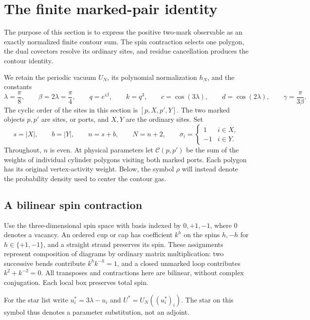 \section{The finite marked-pair identity}
\label{sec:06-magnetic-algebra}

The purpose of this section is to express the positive two-mark
observable as an exactly normalized finite contour sum. The spin
contraction selects one polygon, the dual covectors resolve its
ordinary sites, and residue cancellation produces the contour identity.

We retain the periodic vacuum \(U_N\), its polynomial normalization \(h_N\),
and the constants
\[
 \lambda=\frac{\pi}{8},\qquad \beta=2\lambda=\frac{\pi}{4},\qquad
 q=e^{i\beta},\qquad k=q^3,\qquad
 c=\cos(3\lambda),\qquad d=\cos(2\lambda),\qquad
 \gamma=\frac{\pi}{3\beta}.
\]
The cyclic order of the sites in this section is
\([p,X,p',Y]\).  The two marked objects \(p,p'\) are sites, or ports,
and \(X,Y\) are the ordinary sites.  Set
\[
 s=|X|,\qquad b=|Y|,\qquad n=s+b,\qquad N=n+2,\qquad
 \sigma_i=\begin{cases}1&i\in X,\\-1&i\in Y.\end{cases}
\]
Throughout, \(n\) is even.  At physical parameters let
\(\mathcal C(p,p')\) be the sum of the weights of individual cylinder
polygons visiting both marked ports.  Each polygon has its original
vertex-activity weight.  Below, the symbol \(\rho\) will instead denote
the probability density used to center the contour gas.

\subsection{A bilinear spin contraction}

Use the three-dimensional spin space with basis indexed by \(0,+1,-1\),
where \(0\) denotes a vacancy. An ordered cup or cap has coefficient
\(k^h\) on the spins \(h,-h\) for \(h\in\{+1,-1\}\),
and a straight strand preserves its spin.  These assignments represent
composition of diagrams by ordinary matrix multiplication: two
successive bends contribute \(k^h k^{-h}=1\), and a closed unmarked loop
contributes \(k^2+k^{-2}=0\).  All transposes and contractions here are
bilinear, without complex conjugation.  Each local box preserves total
spin.

For the star list write \(u_i^*=3\lambda-u_i\) and
\(U^*=U_N((u_i^*)_i)\).  The star on this symbol thus denotes a
parameter substitution, not an adjoint.

